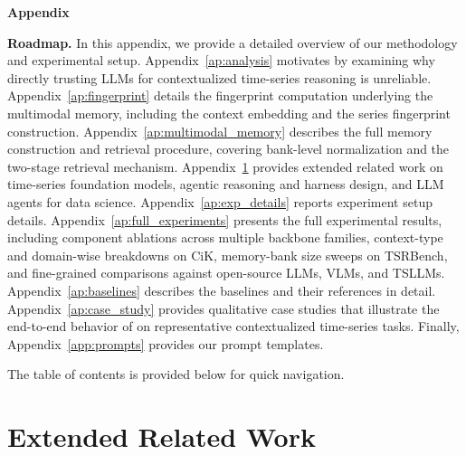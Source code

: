 \appendix

\onecolumn
\begin{center}
{\textbf{\LARGE Appendix}}
\end{center}
\vspace{3mm}

\noindent\textbf{Roadmap.}
In this appendix, we provide a detailed overview of our methodology and experimental setup.
Appendix~\ref{ap:analysis} motivates \method by examining why directly trusting LLMs for contextualized time-series reasoning is unreliable.
Appendix~\ref{ap:fingerprint} details the fingerprint computation underlying the multimodal memory, including the context embedding and the series fingerprint construction.
Appendix~\ref{ap:multimodal_memory} describes the full memory construction and retrieval procedure, covering bank-level normalization and the two-stage retrieval mechanism.
Appendix~\ref{ap:related_work} provides extended related work on time-series foundation models, agentic reasoning and harness design, and LLM agents for data science.
Appendix~\ref{ap:exp_details} reports experiment setup details.
Appendix~\ref{ap:full_experiments} presents the full experimental results, including component ablations across multiple backbone families, context-type and domain-wise breakdowns on CiK, memory-bank size sweeps on TSRBench, and fine-grained comparisons against open-source LLMs, VLMs, and TSLLMs.
Appendix~\ref{ap:baselines} describes the baselines and their references in detail.
Appendix~\ref{ap:case_study} provides qualitative case studies that illustrate the end-to-end behavior of \method on representative contextualized time-series tasks.
Finally, Appendix~\ref{app:prompts} provides our prompt templates.

The table of contents is provided below for quick navigation.

\renewcommand\contentsname{\Large Table of Contents}


{
\tableofcontents
}

\clearpage

\twocolumn









\section{Extended Related Work}
\label{ap:related_work}

